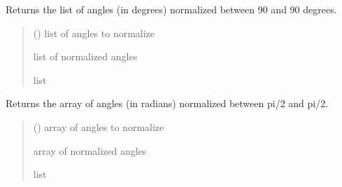 \documentclass[letterpaper,10pt,english]{sphinxmanual}
\begin{document}
\begin{fulllineitems}
\label{\detokenize{micropolarray:micropolarray.utils.normalize2pi}}
\pysigstartsignatures
{}
\pysigstopsignatures
\sphinxAtStartPar
Returns the list of angles (in degrees) normalized between \sphinxhyphen{}90 and 90 degrees.
\begin{quote}\begin{description}
\sphinxAtStartPar
{} () \textendash{} list of angles to normalize

\sphinxAtStartPar
list of normalized angles

\sphinxAtStartPar
list

\end{description}\end{quote}

\end{fulllineitems}


\begin{fulllineitems}
\label{\detokenize{micropolarray:micropolarray.utils.normalize2piarray}}
\pysigstartsignatures
{}
\pysigstopsignatures
\sphinxAtStartPar
Returns the array of angles (in radians) normalized between \sphinxhyphen{}pi/2 and pi/2.
\begin{quote}\begin{description}
\sphinxAtStartPar
{} () \textendash{} array of angles to normalize

\sphinxAtStartPar
array of normalized angles

\sphinxAtStartPar
list

\end{description}\end{quote}

\end{fulllineitems}
\end{document}
